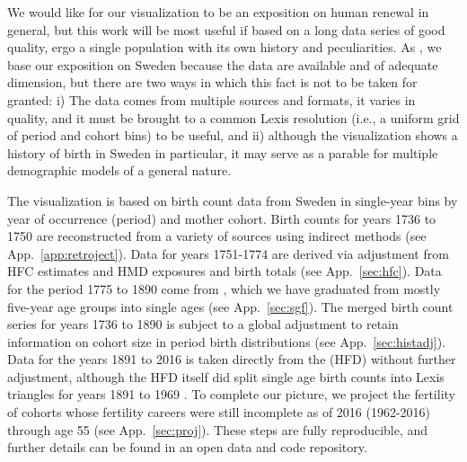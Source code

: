We would like for our visualization to be an exposition on human renewal in general, but this work will be most useful if based on a long data series of good quality, ergo a single population with its own history and peculiarities. As \citet{perozzo1880della}, we base our exposition on Sweden because the data are available and of adequate dimension, but there are two ways in which this fact is not to be taken for granted: i) The data comes from multiple sources and formats, it varies in quality, and it must be brought to a common Lexis resolution  (i.e., a uniform grid of period and cohort bins) to be useful, and ii) although the visualization shows a history of birth in Sweden in particular, it may serve as a parable for multiple demographic models of a general nature. 

The visualization is based on birth count data from Sweden in single-year bins by year of occurrence (period) and mother cohort. Birth counts for years 1736 to 1750 are reconstructed from a variety of sources  using indirect methods (see App.~\ref{app:retroject}). Data for years 1751-1774 are derived via adjustment from HFC estimates and HMD exposures and birth totals (see App.~\ref{sec:hfc}). Data for the period 1775 to 1890 come from \citet{sgf1907}, which we have graduated from mostly five-year age groups into single ages (see App.~\ref{sec:sgf}). The merged birth count series for years 1736 to 1890 is subject to a global adjustment to retain information on cohort size in period birth distributions (see App.~\ref{sec:histadj}). Data for the years 1891 to 2016 is taken directly from the \citet{HFD} (HFD) without further adjustment, although the HFD itself did split single age birth counts into Lexis triangles for years 1891 to 1969 \citep{persson2010human}. To complete our picture, we project the fertility of cohorts whose fertility careers were still incomplete as of 2016 (1962-2016) through age 55 (see App.~\ref{sec:proj}). These steps are fully reproducible, and further details can be found in an open data and code repository.
